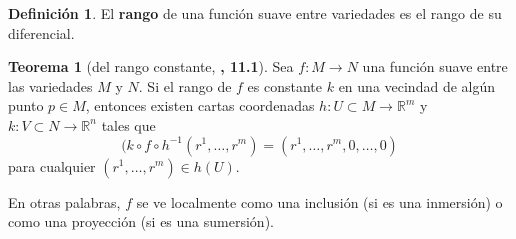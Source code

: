 \documentclass[spanish]{book}
\theoremstyle{definition}
\newtheorem*{defn}{Definición}
\newtheorem*{teo}{Teorema}
\newcommand{\R}{\mathbb{R}}
\begin{document}
	\begin{defn}
		El \textbf{rango} de una función suave entre variedades es el rango de su diferencial.
	\end{defn}
	\begin{teo}[del rango constante, \cite{Loring}\textbf{, 11.1}]
		Sea $f:M\to N$ una función suave entre las variedades $M$ y $N$. Si el rango de $f$ es constante $k$ en una vecindad de algún punto $p\in M$, entonces existen cartas coordenadas $h:U\subset M\to\R^m$ y $k:V\subset N\to\R^n$ tales que
		\[(k\circ f\circ h^{-1}(r^1,\ldots,r^m)=(r^1,\ldots,r^m,0,\ldots,0)\]
		para cualquier $(r^1,\ldots,r^m)\in h(U)$.
	\end{teo}
	En otras palabras, $f$ se ve localmente como una inclusión (si es una inmersión) o como una proyección (si es una sumersión).
	
\end{document}
